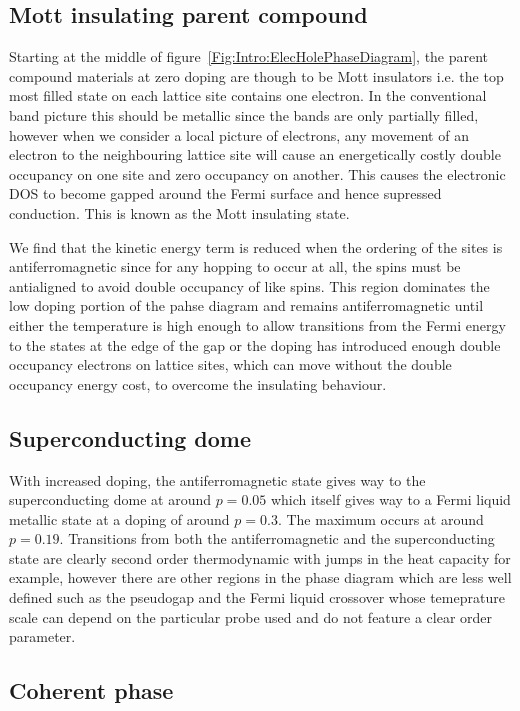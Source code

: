 \subsection{Mott insulating parent compound}

Starting at the middle of figure~\ref{Fig:Intro:ElecHolePhaseDiagram}, the parent compound materials at zero doping are though to be Mott insulators i.e. the top most filled state on each lattice site contains one electron. In the conventional band picture this should be metallic since the bands are only partially filled, however when we consider a local picture of electrons, any movement of an electron to the neighbouring lattice site will cause an energetically costly double occupancy on one site and zero occupancy on another. This causes the electronic \ac{DOS} to become gapped around the Fermi surface and hence supressed conduction. This is known as the Mott insulating state.

We find that the kinetic energy term is reduced when the ordering of the sites is antiferromagnetic since for any hopping to occur at all, the spins must be antialigned to avoid double occupancy of like spins. This region dominates the low doping portion of the pahse diagram and remains antiferromagnetic until either the temperature is high enough to allow transitions from the Fermi energy to the states at the edge of the gap or the doping has introduced enough double occupancy electrons on lattice sites, which can move without the double occupancy energy cost, to overcome the insulating behaviour.

\subsection{Superconducting dome}

With increased doping, the antiferromagnetic state gives way to the superconducting dome at around $p=0.05$ which itself gives way to a Fermi liquid metallic state at a doping of around $p=0.3$. The maximum \Tc occurs at around $p=0.19$. Transitions from both the antiferromagnetic and the superconducting state are clearly second order thermodynamic with jumps in the heat capacity for example, however there are other regions in the phase diagram which are less well defined such as the pseudogap and the Fermi liquid crossover whose temeprature scale can depend on the particular probe used and do not feature a clear order parameter.

\subsection{Coherent phase}

